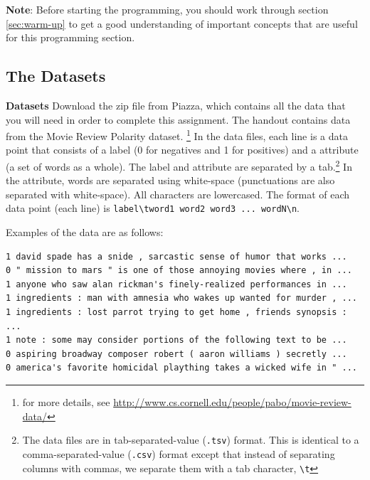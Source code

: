 \documentclass[11pt]{exam}
\numberwithin{equation}{section} %
\numberwithin{figure}{section} %
\numberwithin{table}{section} %
\begin{document}
\textbf{Note}: Before starting the programming, you should work through section \ref{sec:warm-up} to get a good understanding of important concepts that are useful for this programming section. 

\subsection{The Datasets}\label{dataset}


  {\bf Datasets } 
 Download the zip file from Piazza, which contains all the data that you will need in order to complete this assignment.
  The handout contains data from the Movie Review Polarity dataset. \footnote{for more details, see \url{http://www.cs.cornell.edu/people/pabo/movie-review-data/}} In the data files, each line is a data point that consists of a label (0 for negatives and 1 for positives) and a attribute (a set of words as a whole). The label and attribute are separated by a tab.\footnote{The data files are in tab-separated-value (\lstinline{.tsv}) format. This is identical to a comma-separated-value (\lstinline{.csv}) format except that instead of separating columns with commas, we separate them with a tab character, \lstinline{\t}} In the attribute, words are separated using white-space (punctuations are also separated with white-space). All characters are lowercased. The format of each data point (each line) is \lstinline{label\tword1 word2 word3 ... wordN\n}.

Examples of the data are as follows:
 
\begin{lstlisting}
1 david spade has a snide , sarcastic sense of humor that works ... 
0 " mission to mars " is one of those annoying movies where , in ...
1 anyone who saw alan rickman's finely-realized performances in ...
1 ingredients : man with amnesia who wakes up wanted for murder , ...
1 ingredients : lost parrot trying to get home , friends synopsis : ... 
1 note : some may consider portions of the following text to be ...
0 aspiring broadway composer robert ( aaron williams ) secretly ...
0 america's favorite homicidal plaything takes a wicked wife in " ...
\end{lstlisting}
\end{document}
